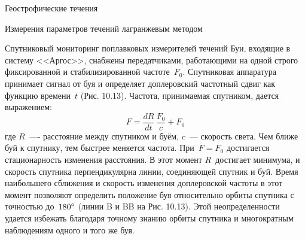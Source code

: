 \begin{chapter}{Геострофические течения}
\begin{section}{Измерения параметров течений лагранжевым методом}
\begin{paragraph}{Спутниковый мониторинг поплавковых измерителей течений}
Буи, входящие в систему <<Аргос>>, снабжены передатчиками, работающими
на одной строго фиксированной и стабилизированной
частоте~$F_0$. Спутниковая аппаратура принимает сигнал от буя и
определяет доплеровский частотный сдвиг как функцию времени~$t$
(Рис. 10.13). Частота, принимаемая спутником, дается выражением:
\begin{displaymath}
F=\frac{dR}{dt}\,\frac{F_0}{c} + F_0
\end{displaymath}
где $R$~---- расстояние между спутником и буём, $c$~--- скорость
света. Чем ближе буй к спутнику, тем быстрее меняется частота.
При~$F=F_0$ достигается стационарность изменения расстояния. В этот
момент $R$~достигает минимума, и скорость спутника перпендикулярна
линии, соединяющей спутник и буй. Время наибольшего сближения и
скорость изменения доплеровской частоты в этот момент позволяют
определить положение буя относительно орбиты спутника с точностью
до~${180}^\circ$ (линии B и BB на Рис. 10.13). Этой неопределенности
удается избежать благодаря точному знанию орбиты спутника и
многократным наблюдениям одного и того же буя.
%


\end{paragraph}
\end{section}
\end{chapter}
